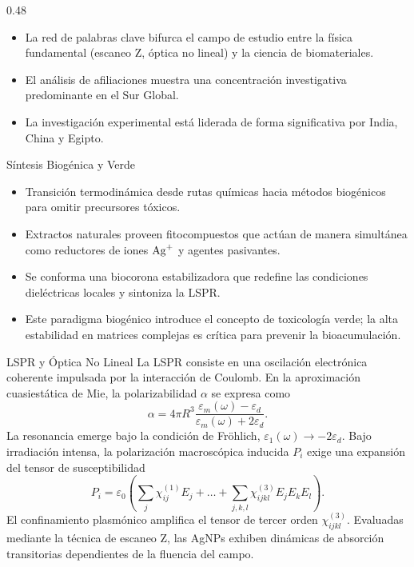 \documentclass[final]{beamer}
\begin{document}
\begin{frame}[t]
\begin{columns}[t]
    \begin{column}{0.48\textwidth}
      \begin{itemize}
        \item La red de palabras clave bifurca el campo de estudio entre la
          física fundamental (escaneo Z, óptica no lineal) y la ciencia de
          biomateriales.
        \item El análisis de afiliaciones muestra una concentración
          investigativa predominante en el Sur Global.
        \item La investigación experimental está liderada de forma significativa
          por India, China y Egipto.
      \end{itemize}
      \begin{block}{Síntesis Biogénica y Verde}
        \begin{itemize}
          \item Transición termodinámica desde rutas químicas hacia métodos
            biogénicos para omitir precursores tóxicos.
          \item Extractos naturales proveen fitocompuestos que actúan de manera
            simultánea como reductores de iones $\ce{Ag^+}$ y agentes
            pasivantes.
          \item Se conforma una biocorona estabilizadora que redefine
            las condiciones dieléctricas locales y sintoniza la LSPR.
          \item Este paradigma biogénico introduce el concepto de toxicología
            verde; la alta estabilidad en matrices complejas es crítica para
            prevenir la bioacumulación.
        \end{itemize}
      \end{block}

      \begin{block}{LSPR y Óptica No Lineal}
        La LSPR consiste en una oscilación electrónica coherente impulsada por
        la interacción de Coulomb. En la aproximación cuasiestática de Mie,
        la polarizabilidad $\alpha$ se expresa como
        \begin{equation}
          \alpha = 4\pi R^3
          \frac{\varepsilon_m(\omega) - \varepsilon_d}
          {\varepsilon_m(\omega) + 2\varepsilon_d}.
        \end{equation}
        La resonancia emerge bajo la condición de Fröhlich,
        $\varepsilon_1(\omega) \to -2\varepsilon_d$. Bajo irradiación intensa,
        la polarización macroscópica inducida $P_i$ exige una expansión del
        tensor de susceptibilidad
        \begin{equation}
          P_i = \varepsilon_0 \left( \sum_j \chi_{ij}^{(1)} E_j + \dots +
          \sum_{j,k,l} \chi_{ijkl}^{(3)} E_j E_k E_l \right).
        \end{equation}
        El confinamiento plasmónico amplifica el tensor de tercer orden
        $\chi_{ijkl}^{(3)}$. Evaluadas mediante la técnica de escaneo Z,
        las AgNPs exhiben dinámicas de absorción transitorias dependientes
        de la fluencia del campo.


\end{block}
\end{column}
\end{columns}
\end{frame}
\end{document}
